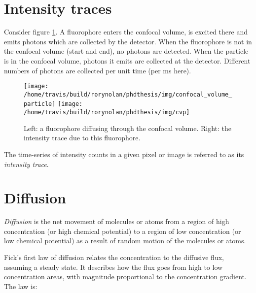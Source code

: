 \documentclass[12pt,]{book}
\theoremstyle{definition}
\theoremstyle{definition}
\theoremstyle{definition}
\theoremstyle{remark}
\let\BeginKnitrBlock\begin \let\EndKnitrBlock\end
\begin{document}
\section{Intensity traces}\label{intensity-traces}

Consider figure \ref{fig:confocal-volume-particle}. A fluorophore enters
the confocal volume, is excited there and emits photons which are
collected by the detector. When the fluorophore is not in the confocal
volume (start and end), no photons are detected. When the particle is in
the confocal volume, photons it emits are collected at the detector.
Different numbers of photons are collected per unit time (per ms here).





\begin{figure}

\texttt{[image: /home/travis/build/rorynolan/phdthesis/img/confocal\_volume\_particle]} \texttt{[image: /home/travis/build/rorynolan/phdthesis/img/cvp]} \hfill{}

\caption{Left: a fluorophore diffusing
through the confocal volume. Right: the intensity trace due to this
fluorophore.}\label{fig:confocal-volume-particle}
\end{figure}

\BeginKnitrBlock{definition}
\protect\hypertarget{def:unnamed-chunk-9}{}{\label{def:unnamed-chunk-9} }The
time-series of intensity counts in a given pixel or image is referred to
as its \emph{intensity trace}.
\EndKnitrBlock{definition}

\section{Diffusion}\label{diffusion}

\BeginKnitrBlock{definition}
\protect\hypertarget{def:unnamed-chunk-10}{}{\label{def:unnamed-chunk-10}
}\emph{Diffusion} is the net movement of molecules or atoms from a
region of high concentration (or high chemical potential) to a region of
low concentration (or low chemical potential) as a result of random
motion of the molecules or atoms.
\EndKnitrBlock{definition}

Fick's first law of diffusion relates the concentration to the diffusive
flux, assuming a steady state. It describes how the flux goes from high
to low concentration areas, with magnitude proportional to the
concentration gradient. The law is:
\end{document}
